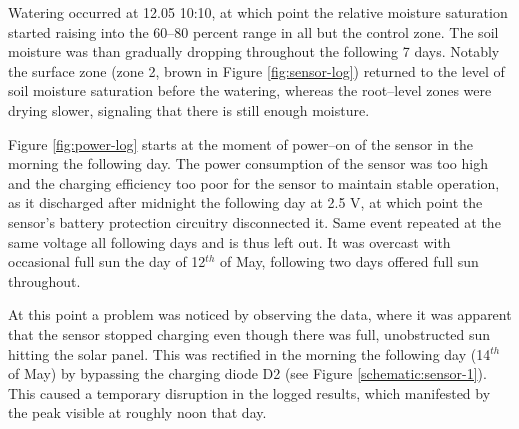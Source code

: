Watering occurred at 12.05 10:10, at which point the relative moisture saturation started raising into the 60--80 percent range in all but the control zone. The soil moisture was than gradually dropping throughout the following 7 days. Notably the surface zone (zone 2, brown in Figure \ref{fig:sensor-log}) returned to the level of soil moisture saturation before the watering, whereas the root--level zones were drying slower, signaling that there is still enough moisture.

Figure \ref{fig:power-log} starts at the moment of power--on of the sensor in the morning the following day. The power consumption of the sensor was too high and the charging efficiency too poor for the sensor to maintain stable operation, as it discharged after midnight the following day at 2.5 V, at which point the sensor's battery protection circuitry disconnected it. Same event repeated at the same voltage all following days and is thus left out. It was overcast with occasional full sun the day of 12$^{th}$ of May, following two days offered full sun throughout.

At this point a problem was noticed by observing the data, where it was apparent that the sensor stopped charging even though there was full, unobstructed sun hitting the solar panel. This was rectified in the morning the following day (14$^{th}$ of May) by bypassing the charging diode D2 (see Figure \ref{schematic:sensor-1}). This caused a temporary disruption in the logged results, which manifested by the peak visible at roughly noon that day.

